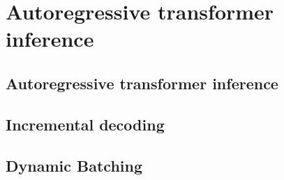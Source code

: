 
\chapter{Autoregressive transformer inference}


\section{Autoregressive transformer inference}

\section{Incremental decoding}

\section{Dynamic Batching}